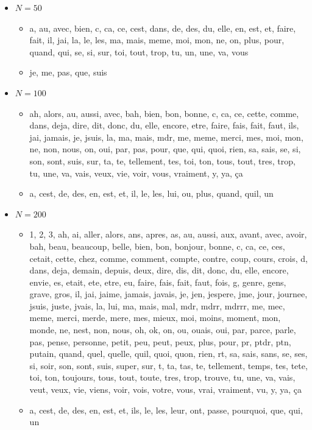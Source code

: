 \begin{itemize}
\item $N = 50$
	\begin{itemize}
	\item a, au, avec, bien, c, ca, ce, cest, dans, de, des, du, elle, en, est, et, faire, fait, il, jai, la, le, les, ma, mais, meme, moi, mon, ne, on, plus, pour, quand, qui, se, si, sur, toi, tout, trop, tu, un, une, va, vous
	\item je, me, pas, que, suis
	\end{itemize}
\item $N = 100$
	\begin{itemize}
	\item ah, alors, au, aussi, avec, bah, bien, bon, bonne, c, ca, ce, cette, comme, dans, deja, dire, dit, donc, du, elle, encore, etre, faire, fais, fait, faut, ils, jai, jamais, je, jsuis, la, ma, mais, mdr, me, meme, merci, mes, moi, mon, ne, non, nous, on, oui, par, pas, pour, que, qui, quoi, rien, sa, sais, se, si, son, sont, suis, sur, ta, te, tellement, tes, toi, ton, tous, tout, tres, trop, tu, une, va, vais, veux, vie, voir, vous, vraiment, y, ya, ça
	\item a, cest, de, des, en, est, et, il, le, les, lui, ou, plus, quand, quil, un
	\end{itemize}
\item $N = 200$
 \begin{itemize}
 	\item 1, 2, 3, ah, ai, aller, alors, ans, apres, as, au, aussi, aux, avant, avec, avoir, bah, beau, beaucoup, belle, bien, bon, bonjour, bonne, c, ca, ce, ces, cetait, cette, chez, comme, comment, compte, contre, coup, cours, crois, d, dans, deja, demain, depuis, deux, dire, dis, dit, donc, du, elle, encore, envie, es, etait, ete, etre, eu, faire, fais, fait, faut, fois, g, genre, gens, grave, gros, il, jai, jaime, jamais, javais, je, jen, jespere, jme, jour, journee, jsuis, juste, jvais, la, lui, ma, mais, mal, mdr, mdrr, mdrrr, me, mec, meme, merci, merde, mere, mes, mieux, moi, moins, moment, mon, monde, ne, nest, non, nous, oh, ok, on, ou, ouais, oui, par, parce, parle, pas, pense, personne, petit, peu, peut, peux, plus, pour, pr, ptdr, ptn, putain, quand, quel, quelle, quil, quoi, quon, rien, rt, sa, sais, sans, se, ses, si, soir, son, sont, suis, super, sur, t, ta, tas, te, tellement, temps, tes, tete, toi, ton, toujours, tous, tout, toute, tres, trop, trouve, tu, une, va, vais, veut, veux, vie, viens, voir, vois, votre, vous, vrai, vraiment, vu, y, ya, ça
 	\item a, cest, de, des, en, est, et, ils, le, les, leur, ont, passe, pourquoi, que, qui, un
 \end{itemize}
\end{itemize}
